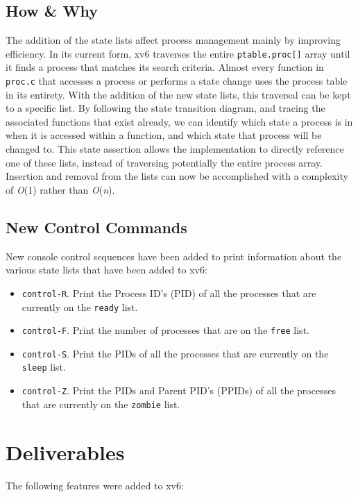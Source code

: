 \documentclass[11pt,letterpaper]{report}
\begin{document}
	\subsection{How \& Why}
	The addition of the state lists affect process management mainly by improving efficiency. In its current form, xv6 traverses the entire {\tt ptable.proc[]} array until it finds a process that matches its search criteria. Almost every function in {\tt proc.c} that accesses a process or performs a state change uses the process table in its entirety. With the addition of the new state lists, this traversal can be kept to a specific list. By following the state transition diagram, and tracing the associated functions that exist already, we can identify which state a process is in when it is accessed within a function, and which state that process will be changed to. This state assertion allows the implementation to directly reference one of these lists, instead of traversing potentially the entire process array.\\
	Insertion and removal from the lists can now be accomplished with a complexity of \emph{O}(1) rather than \emph{O}(\emph{n}).
	
	\subsection{New Control Commands}
	New console control sequences have been added to print information about the various state lists that have been added to xv6:
	
	\begin{itemize}
		\item {\tt control-R}. Print the Process ID's (PID) of all the processes that are currently on the {\tt ready} list.
		\item {\tt control-F}. Print the number of processes that are on the {\tt free} list.
		\item {\tt control-S}. Print the PIDs of all the processes that are currently on the {\tt sleep} list.
		\item {\tt control-Z}. Print the PIDs and Parent PID's (PPIDs) of all the processes that are currently on the {\tt zombie} list.
	\end{itemize}

\newpage
	\section{Deliverables}
	The following features were added to xv6:
	
\end{document}
